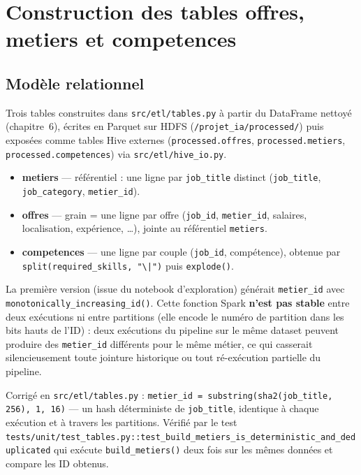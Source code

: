 \chapter{Construction des tables offres, metiers et competences}

\section{Modèle relationnel}

Trois tables construites dans \texttt{src/etl/tables.py} à partir du
DataFrame nettoyé (chapitre~6), écrites en Parquet sur HDFS
(\texttt{/projet\_ia/processed/}) puis exposées comme tables Hive
externes (\texttt{processed.offres}, \texttt{processed.metiers},
\texttt{processed.competences}) via \texttt{src/etl/hive\_io.py}.

\begin{itemize}[leftmargin=1.5em]
  \item \textbf{metiers} — référentiel : une ligne par
    \texttt{job\_title} distinct (\texttt{job\_title},
    \texttt{job\_category}, \texttt{metier\_id}).
  \item \textbf{offres} — grain = une ligne par offre
    (\texttt{job\_id}, \texttt{metier\_id}, salaires, localisation,
    expérience, \dots), jointe au référentiel \texttt{metiers}.
  \item \textbf{competences} — une ligne par couple
    (\texttt{job\_id}, compétence), obtenue par
    \texttt{split(required\_skills, "\textbackslash{}|")} puis
    \texttt{explode()}.
\end{itemize}

\begin{constat}
La première version (issue du notebook d'exploration) générait
\texttt{metier\_id} avec
\texttt{monotonically\_increasing\_id()}. Cette fonction Spark
\textbf{n'est pas stable} entre deux exécutions ni entre partitions
(elle encode le numéro de partition dans les bits hauts de l'ID) : deux
exécutions du pipeline sur le même dataset peuvent produire des
\texttt{metier\_id} différents pour le même métier, ce qui casserait
silencieusement toute jointure historique ou tout ré-exécution
partielle du pipeline.

Corrigé en \texttt{src/etl/tables.py} :
\texttt{metier\_id = substring(sha2(job\_title, 256), 1, 16)} — un
hash déterministe de \texttt{job\_title}, identique à chaque exécution
et à travers les partitions. Vérifié par le test
\texttt{tests/unit/test\_tables.py::test\_build\_metiers\_is\_deterministic\_and\_deduplicated}
qui exécute \texttt{build\_metiers()} deux fois sur les mêmes données
et compare les ID obtenus.
\end{constat}

